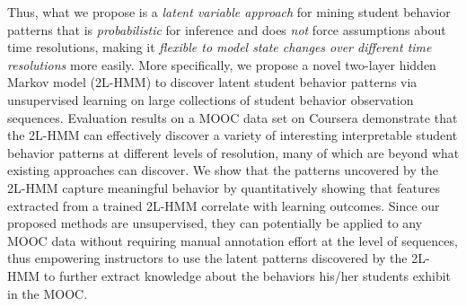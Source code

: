 Thus, what we propose is a \emph{latent variable approach} for mining
student behavior patterns that is \emph{probabilistic} for inference and
does \emph{not} force assumptions about time resolutions, making it
\emph{flexible to model state changes over different time resolutions} more
easily.  More specifically, we propose a novel two-layer hidden Markov
model (2L-HMM) to discover latent student behavior patterns via
unsupervised learning on large collections of student behavior observation
sequences.  Evaluation results on a MOOC data set on Coursera demonstrate
that the 2L-HMM can effectively discover a variety of interesting
interpretable student behavior patterns at different levels of resolution,
many of which are beyond what existing approaches can discover. We show
that the patterns uncovered by the 2L-HMM capture meaningful behavior by
quantitatively showing that features extracted from a trained 2L-HMM
correlate with learning outcomes. Since our proposed methods are
unsupervised, they can potentially be applied to any MOOC data without
requiring manual annotation effort at the level of sequences, thus
empowering instructors to use the latent patterns discovered by the 2L-HMM
to further extract knowledge about the behaviors his/her students exhibit
in the MOOC.
